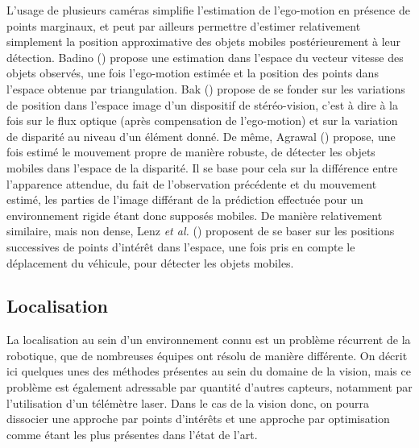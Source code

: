 L'usage de plusieurs caméras simplifie l'estimation de l'ego-motion en présence de points marginaux, et peut par ailleurs permettre d'estimer relativement simplement la position approximative des objets mobiles postérieurement à leur détection. Badino (\cite{Badino2008}) propose une estimation dans l'espace du vecteur vitesse des objets observés, une fois l'ego-motion estimée et la position des points dans l'espace obtenue par triangulation. Bak (\cite{Bak2011}) propose de se fonder sur les variations de position dans l'espace image d'un dispositif de stéréo-vision, c'est à dire à la fois sur le flux optique (après compensation de l'ego-motion) et sur la variation de disparité au niveau d'un élément donné. De même, Agrawal (\cite{Agrawal2007}) propose, une fois estimé le mouvement propre de manière robuste, de détecter les objets mobiles dans l'espace de la disparité. Il se base pour cela sur la différence entre l'apparence attendue, du fait de l'observation précédente et du mouvement estimé, les parties de l'image différant de la prédiction effectuée pour un environnement rigide étant donc supposés mobiles. De manière relativement similaire, mais non dense, Lenz \textit{et al.} (\cite{Lenz2011}) proposent de se baser sur les positions successives de points d'intérêt dans l'espace, une fois pris en compte le déplacement du véhicule, pour détecter les objets mobiles.

\subsection{Localisation}
La localisation au sein d'un environnement connu est un problème récurrent de la robotique, que de nombreuses équipes ont résolu de manière différente. On décrit ici quelques unes des méthodes présentes au sein du domaine de la vision, mais ce problème est également adressable par quantité d'autres capteurs, notamment par l'utilisation d'un télémètre laser. Dans le cas de la vision donc, on pourra dissocier une approche par points d'intérêts et une approche par optimisation comme étant les plus présentes dans l'état de l'art. \\

